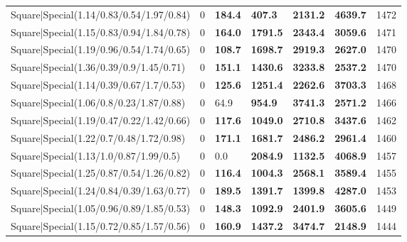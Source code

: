 \begin{tabular}{lrllllr}
 Square|Special(1.14/0.83/0.54/1.97/0.84)                      &             0   & \textbf{184.4} & \textbf{407.3}  & \textbf{2131.2} & \textbf{4639.7} &         1472 \\
 Square|Special(1.15/0.83/0.94/1.84/0.78)                      &             0   & \textbf{164.0} & \textbf{1791.5} & \textbf{2343.4} & \textbf{3059.6} &         1471 \\
 Square|Special(1.19/0.96/0.54/1.74/0.65)                      &             0   & \textbf{108.7} & \textbf{1698.7} & \textbf{2919.3} & \textbf{2627.0} &         1470 \\
 Square|Special(1.36/0.39/0.9/1.45/0.71)                       &             0   & \textbf{151.1} & \textbf{1430.6} & \textbf{3233.8} & \textbf{2537.2} &         1470 \\
 Square|Special(1.14/0.39/0.67/1.7/0.53)                       &             0   & \textbf{125.6} & \textbf{1251.4} & \textbf{2262.6} & \textbf{3703.3} &         1468 \\
 Square|Special(1.06/0.8/0.23/1.87/0.88)                       &             0   & 64.9           & \textbf{954.9}  & \textbf{3741.3} & \textbf{2571.2} &         1466 \\
 Square|Special(1.19/0.47/0.22/1.42/0.66)                      &             0   & \textbf{117.6} & \textbf{1049.0} & \textbf{2710.8} & \textbf{3437.6} &         1462 \\
 Square|Special(1.22/0.7/0.48/1.72/0.98)                       &             0   & \textbf{171.1} & \textbf{1681.7} & \textbf{2486.2} & \textbf{2961.4} &         1460 \\
 Square|Special(1.13/1.0/0.87/1.99/0.5)                        &             0   & 0.0            & \textbf{2084.9} & \textbf{1132.5} & \textbf{4068.9} &         1457 \\
 Square|Special(1.25/0.87/0.54/1.26/0.82)                      &             0   & \textbf{116.4} & \textbf{1004.3} & \textbf{2568.1} & \textbf{3589.4} &         1455 \\
 Square|Special(1.24/0.84/0.39/1.63/0.77)                      &             0   & \textbf{189.5} & \textbf{1391.7} & \textbf{1399.8} & \textbf{4287.0} &         1453 \\
 Square|Special(1.05/0.96/0.89/1.85/0.53)                      &             0   & \textbf{148.3} & \textbf{1092.9} & \textbf{2401.9} & \textbf{3605.6} &         1449 \\
 Square|Special(1.15/0.72/0.85/1.57/0.56)                      &             0   & \textbf{160.9} & \textbf{1437.2} & \textbf{3474.7} & \textbf{2148.9} &         1444 \\

\end{tabular}
